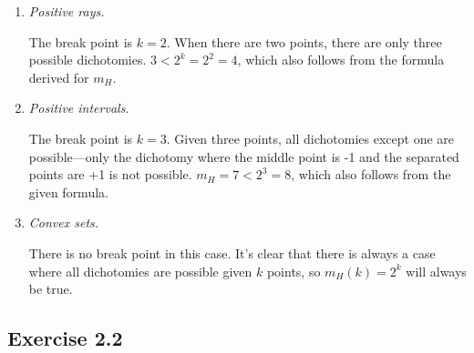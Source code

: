 \documentclass{article}
\begin{document}
\begin{enumerate}
  \item \textit{Positive rays.}

    The break point is $k = 2$. When there are two points, there are only three possible 
    dichotomies. $3 < 2^k = 2^2 = 4$, which also follows from the formula derived for $m_H$.

  \item \textit{Positive intervals.}

    The break point is $k = 3$. Given three points, all dichotomies except one are possible---only
    the dichotomy where the middle point is -1 and the separated points are +1 is not possible.
    $m_H = 7 < 2^3 = 8$, which also follows from the given formula.

  \item \textit{Convex sets.}

    There is no break point in this case. It's clear that there is always a case where
    all dichotomies are possible given $k$ points, so $m_H(k) = 2^k$ will always be true.

\end{enumerate}


\subsection*{Exercise 2.2}

\textit{}
\end{document}
